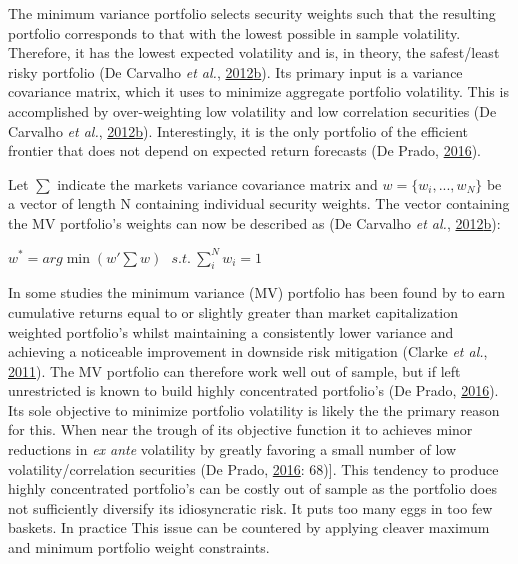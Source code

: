 \documentclass[11pt,preprint, authoryear]{elsarticle}
\numberwithin{equation}{section}
\numberwithin{figure}{section}
\numberwithin{table}{section}
\begin{document}
The minimum variance portfolio selects security weights such that the
resulting portfolio corresponds to that with the lowest possible in
sample volatility. Therefore, it has the lowest expected volatility and
is, in theory, the safest/least risky portfolio (De Carvalho \emph{et
al.},
\protect\hyperlink{ref-rawl2012}{2012}\protect\hyperlink{ref-rawl2012}{b}).
Its primary input is a variance covariance matrix, which it uses to
minimize aggregate portfolio volatility. This is accomplished by
over-weighting low volatility and low correlation securities (De
Carvalho \emph{et al.},
\protect\hyperlink{ref-rawl2012}{2012}\protect\hyperlink{ref-rawl2012}{b}).
Interestingly, it is the only portfolio of the efficient frontier that
does not depend on expected return forecasts (De Prado,
\protect\hyperlink{ref-lopez}{2016}).

Let \(\sum\) indicate the markets variance covariance matrix and
\(w=\{w_i,..., w_N \}\) be a vector of length N containing individual
security weights. The vector containing the MV portfolio's weights can
now be described as (De Carvalho \emph{et al.},
\protect\hyperlink{ref-rawl2012}{2012}\protect\hyperlink{ref-rawl2012}{b}):

\begin{center}
$w^*=arg\min(w'\sum w)\ \ \ s.t.\ \sum^N_iw_i=1$ 
\end{center}

In some studies the minimum variance (MV) portfolio has been found by to
earn cumulative returns equal to or slightly greater than market
capitalization weighted portfolio's whilst maintaining a consistently
lower variance and achieving a noticeable improvement in downside risk
mitigation (Clarke \emph{et al.},
\protect\hyperlink{ref-clarke2011}{2011}). The MV portfolio can
therefore work well out of sample, but if left unrestricted is known to
build highly concentrated portfolio's (De Prado,
\protect\hyperlink{ref-lopez}{2016}). Its sole objective to minimize
portfolio volatility is likely the the primary reason for this. When
near the trough of its objective function it to achieves minor
reductions in \emph{ex ante} volatility by greatly favoring a small
number of low volatility/correlation securities (De Prado,
\protect\hyperlink{ref-lopez}{2016}: 68){]}. This tendency to produce
highly concentrated portfolio's can be costly out of sample as the
portfolio does not sufficiently diversify its idiosyncratic risk. It
puts too many eggs in too few baskets. In practice This issue can be
countered by applying cleaver maximum and minimum portfolio weight
constraints.
\end{document}
